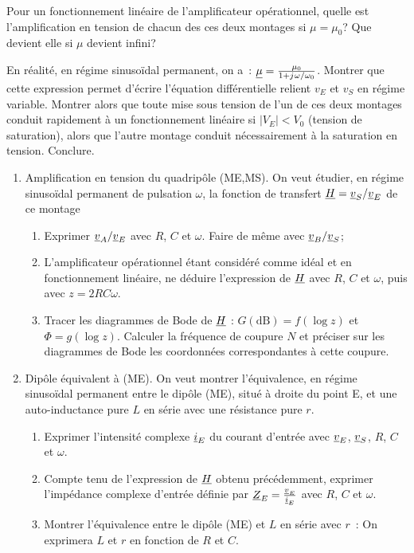 \begin{exercice}%
Pour un fonctionnement linéaire de l'amplificateur opérationnel, quelle est 
  l'amplification en tension de chacun des ces deux montages si \(\mu = 
  \mu_0\)? Que devient elle si \(\mu\) devient infini?

En réalité, en régime sinusoïdal permanent, on a~: \(\underline{\mu} = 
  \frac{\mu_0}{1+{j\mkern1mu} \omega/\omega_0}\). Montrer que cette expression permet 
  d'écrire l'équation différentielle relient \(v_E\) et \(v_S\) en régime 
  variable. Montrer alors que toute mise sous tension de l'un de ces deux 
  montages conduit rapidement à un fonctionnement linéaire si \(\mid V_E \mid < 
  V_0\) (tension de saturation), alors que l'autre montage conduit 
  nécessairement à la saturation en tension. Conclure.
\end{exercice}%
\begin{exercice}%
\begin{enumerate}%
  \item Amplification en tension du quadripôle (ME,MS). On veut étudier, en 
    régime sinusoïdal permanent de pulsation \(\omega\), la fonction de 
    transfert \(\underline{H} = \underline{v}_S / \underline{v}_E\) de ce montage
  \begin{enumerate}
    \item Exprimer \(\underline{v}_A/\underline{v}_E\) avec \(R\), \(C\) et 
      \(\omega\). Faire de même avec \(\underline{v}_B/\underline{v}_S\);
    \item L'amplificateur opérationnel étant considéré comme idéal et en 
      fonctionnement linéaire, ne déduire l'expression de \(\underline{H}\) avec \(R\), 
      \(C\) et \(\omega\), puis avec \(z=2RC\omega\).
    \item Tracer les diagrammes de Bode de \(\underline{H}\) : \(G(\si{\dB}) = f(\log 
      z)\) et \(\Phi = g(\log z)\). Calculer la fréquence de coupure \(N\) et 
      préciser sur les diagrammes de Bode les coordonnées correspondantes à 
      cette coupure.
  \end{enumerate}
  \item Dipôle équivalent à (ME). On veut montrer l'équivalence, en régime 
    sinusoïdal permanent entre le dipôle (ME), situé à droite du point E, et 
    une auto-inductance pure \(L\) en série avec une résistance pure \(r\).
  \begin{enumerate}
    \item Exprimer l'intensité complexe \(\underline{i}_E\) du courant d'entrée avec 
      \(\underline{v}_E\), \(\underline{v}_S\), \(R\), \(C\) et \(\omega\).
    \item Compte tenu de l'expression de \(\underline{H}\) obtenu précédemment, exprimer 
      l'impédance complexe d'entrée définie par \(\underline{Z}_E = 
      \frac{\underline{v}_E}{\underline{i}_E}\) avec \(R\), \(C\) et \(\omega\).
    \item Montrer l'équivalence entre le dipôle (ME) et \(L\) en série avec 
      \(r\)~: On exprimera \(L\) et \(r\) en fonction de \(R\) et \(C\).
  \end{enumerate}
\end{enumerate}%
\end{exercice}%
